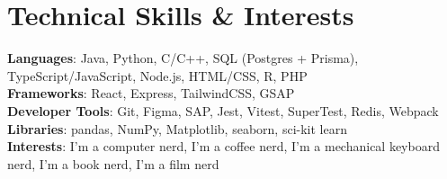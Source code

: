 \documentclass[letterpaper,11pt]{article}
\begin{document}
\section{Technical Skills \& Interests}
 \begin{itemize}[leftmargin=0.15in, label={}]
    \small{\item{
     \textbf{Languages}{: Java, Python, C/C++, SQL (Postgres + Prisma), TypeScript/JavaScript, Node.js, HTML/CSS, R, PHP} \\
     \textbf{Frameworks}{: React, Express, TailwindCSS, GSAP} \\
     \textbf{Developer Tools}{: Git, Figma, SAP, Jest, Vitest, SuperTest, Redis, Webpack} \\
     \textbf{Libraries}{: pandas, NumPy, Matplotlib, seaborn, sci-kit learn} \\
     \textbf{Interests}{: I’m a computer nerd, I’m a coffee nerd, I’m a mechanical keyboard nerd, I’m a book nerd, I’m a film nerd}
    }}
 \end{itemize}


\end{document}

